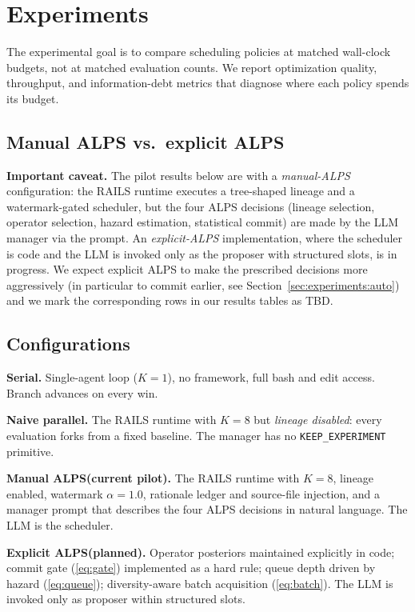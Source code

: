 \documentclass{article}
\newcommand{\alps}{ALPS\xspace}
\newcommand{\rails}{RAILS\xspace}
\newcommand{\keep}{\texttt{KEEP\_EXPERIMENT}\xspace}
\begin{document}
\section{Experiments}
\label{sec:experiments}

The experimental goal is to compare scheduling policies at matched wall-clock budgets, not at matched evaluation counts. We report optimization quality, throughput, and information-debt metrics that diagnose where each policy spends its budget.

\subsection{Manual ALPS vs.\ explicit ALPS}

\textbf{Important caveat.} The pilot results below are with a \emph{manual-\alps} configuration: the \rails runtime executes a tree-shaped lineage and a watermark-gated scheduler, but the four \alps decisions (lineage selection, operator selection, hazard estimation, statistical commit) are made by the LLM manager via the prompt. An \emph{explicit-\alps} implementation, where the scheduler is code and the LLM is invoked only as the proposer with structured slots, is in progress. We expect explicit \alps to make the prescribed decisions more aggressively (in particular to commit earlier, see Section~\ref{sec:experiments:auto}) and we mark the corresponding rows in our results tables as TBD.

\subsection{Configurations}

\textbf{Serial.} Single-agent loop ($K=1$), no framework, full bash and edit access. Branch advances on every win.

\textbf{Naive parallel.} The \rails runtime with $K=8$ but \emph{lineage disabled}: every evaluation forks from a fixed baseline. The manager has no \keep primitive.

\textbf{Manual \alps (current pilot).} The \rails runtime with $K=8$, lineage enabled, watermark $\alpha=1.0$, rationale ledger and source-file injection, and a manager prompt that describes the four \alps decisions in natural language. The LLM is the scheduler.

\textbf{Explicit \alps (planned).} Operator posteriors maintained explicitly in code; commit gate (\ref{eq:gate}) implemented as a hard rule; queue depth driven by hazard (\ref{eq:queue}); diversity-aware batch acquisition (\ref{eq:batch}). The LLM is invoked only as proposer within structured slots.
\end{document}
